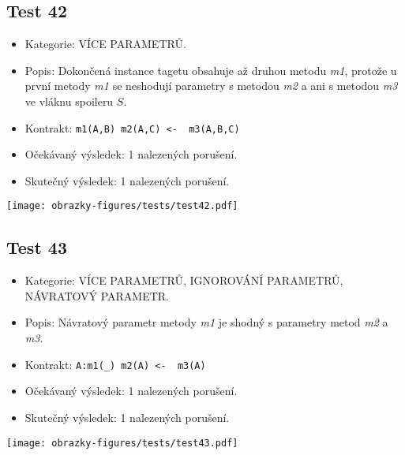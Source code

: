 \subsection*{Test 42}
\begin{itemize}
\item Kategorie: VÍCE PARAMETRŮ.
\item Popis: Dokončená instance tagetu obsahuje až druhou metodu \textit{m1}, protože u první metody \textit{m1} se neshodují parametry s metodou \textit{m2} a ani s metodou \textit{m3} ve vláknu spoileru $S$. 
\item Kontrakt: \texttt{m1(A,B) m2(A,C) <- { m3(A,B,C) }}

\item Očekávaný výsledek: 1 nalezených porušení.
\item Skutečný výsledek: 1 nalezených porušení.
\end{itemize}
\begin{center}
    \centering
    \texttt{[image: obrazky-figures/tests/test42.pdf]}
    \label{test42}
\end{center}

\subsection*{Test 43}
\begin{itemize}
\item Kategorie: VÍCE PARAMETRŮ, IGNOROVÁNÍ PARAMETRŮ, NÁVRATOVÝ PARAMETR.
\item Popis: Návratový parametr metody \textit{m1} je shodný s parametry metod \textit{m2} a \textit{m3}. 
\item Kontrakt: \texttt{A:m1(_) m2(A) <- { m3(A) }}
\item Očekávaný výsledek: 1 nalezených porušení.

\item Skutečný výsledek: 1 nalezených porušení.
\end{itemize}
\begin{center}
    \centering
    \texttt{[image: obrazky-figures/tests/test43.pdf]}
    \label{test43}
\end{center}
